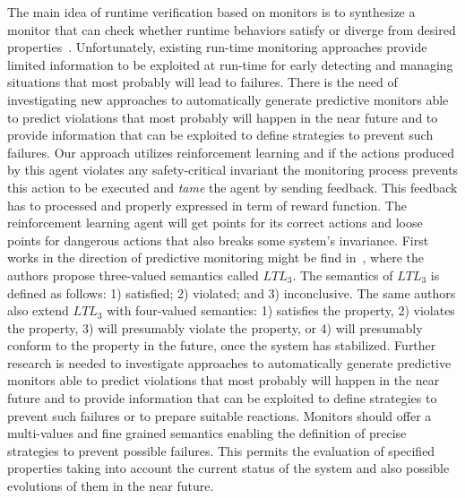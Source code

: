 \documentclass[sigconf,review, anonymous]{acmart}
\begin{document}
The main idea of runtime verification based on monitors is to synthesize a monitor that can check whether runtime behaviors satisfy or diverge from desired properties~\cite{Delgado2004,Leucker2009293}.
Unfortunately, existing run-time monitoring approaches  provide limited information to be exploited at run-time for early detecting
and managing situations that most probably will lead to failures. 
There is the need of %
investigating new approaches to automatically generate predictive monitors  
able to predict violations that most probably will happen in the near future and to provide information that can be
exploited to define strategies to prevent such failures. Our approach utilizes reinforcement learning and if the actions produced by this agent violates any safety-critical invariant the monitoring process prevents this action to be executed and \emph{tame} the agent by sending feedback. This feedback has to processed and properly expressed in term of reward function. The reinforcement learning agent will get points for its correct actions and loose points for dangerous actions that also breaks some system's invariance. 
First works in the direction of predictive monitoring might be find in~\cite{Bauer2011}, where the authors %
propose three-valued semantics called $LTL_3$. The semantics of $LTL_3$ is defined as follows: 1) satisfied; 2) violated; and 3) inconclusive. The same authors also extend $LTL_3$ with four-valued semantics: 1) satisfies the
 property, 2) violates the property, 3) will presumably violate the property, or 4) will presumably conform to the property in the future, once the system has stabilized. Further research is needed to investigate approaches to automatically generate predictive monitors able to predict violations that most probably will happen in the near future and to provide information that can be exploited to define strategies to prevent such failures or to prepare suitable reactions. Monitors should offer a multi-values and fine grained semantics enabling the definition of precise
strategies to prevent possible failures. This permits the evaluation of specified properties taking into account the current status of the system and also possible evolutions of them in the near future. 
\end{document}
